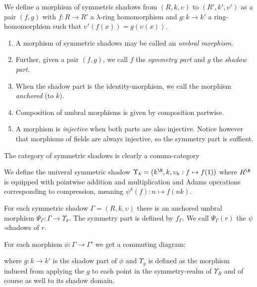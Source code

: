 \begin{definition}
  We define a morphism of symmetric shadows from $(R, k, \upsilon)$ to $(R', k', \upsilon')$ as a pair $(f, g)$ with $f : R \to R'$ a $\lambda$-ring homomorphism and $g : k \to k'$ a ring-homomorphism such that $\upsilon'(f(x)) = g(\upsilon(x))$. 
  \begin{enumerate}
    \item A morphism of symmetric shadows may be called an \emph{umbral morphism}. 
    \item Further, given a pair $(f, g)$, we call $f$ the \emph{symmetry part} and $g$ the \emph{shadow part}. 
    \item When the shadow part is the identity-morphism, we call the morphism \emph{anchored} (to $k$). 
    \item Composition of umbral morphisms is given by composition partwise. 
    \item A morphism is \emph{injective} when both parts are also injective. Notice however that morphisms of fields are always injective, so the symmetry part is suffient.
  \end{enumerate}
\end{definition}

\begin{remark}
  The category of symmetric shadows is clearly a comma-category
\end{remark}

\begin{propdef}
  We define the univeral symmetric shadow $\Upsilon_k = (k^{\N}, k, \upsilon_k : f \mapsto f(1))$ where $R^{\N}$ is equipped with pointwise addition and multiplication and Adams operations corresponding to compression, meaning $\psi^k(f) : n \mapsto f(nk)$.
\end{propdef}

\begin{propdef}
  For each symmetric shadow $\Gamma = (R, k, \upsilon)$ there is an anchored umbral morphism $\Psi_{\Gamma} : \Gamma \to \Upsilon_k$. The symmetry part is defined by $f_\Gamma$. We call $\Psi_{\Gamma}(r)$ the $\psi$-shadows of $r$.
\end{propdef}

\begin{propdef} \label{propdef:upsilonUniversalDiagram}
  For each morphism $\phi : \Gamma \to \Gamma'$ we get a commuting diagram:
  \begin{center}
  \end{center}
  where $g : k \to k'$ is the shadow part of $\phi$ and $\Upsilon_{g}$ is defined as the morphism induced from applying the $g$ to each point in the symmetry-realm of $\Upsilon_R$ and of course as well to its shadow domain.
\end{propdef}

